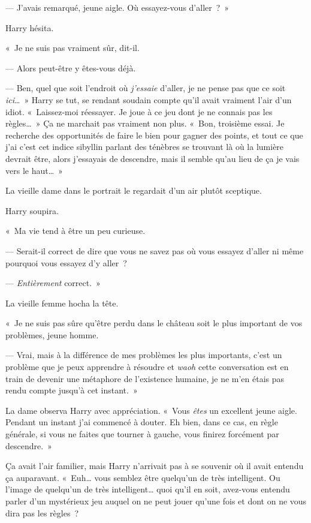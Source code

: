 --- J'avais remarqué, jeune aigle. Où essayez-vous d'aller~?~»

Harry hésita.

«~Je ne suis pas vraiment sûr, dit-il.

--- Alors peut-être y êtes-vous déjà.

--- Ben, quel que soit l'endroit où \emph{j'essaie} d'aller, je ne pense pas que ce soit \emph{ici}…~» Harry se tut, se rendant soudain compte qu'il avait vraiment l'air d'un idiot. «~Laissez-moi réessayer. Je joue à ce jeu dont je ne connais pas les règles…~» Ça ne marchait pas vraiment non plus. «~Bon, troisième essai. Je recherche des opportunités de faire le bien pour gagner des points, et tout ce que j'ai c'est cet indice sibyllin parlant des ténèbres se trouvant là où la lumière devrait être, alors j'essayais de descendre, mais il semble qu'au lieu de ça je vais vers le haut…~»

La vieille dame dans le portrait le regardait d'un air plutôt sceptique.

Harry soupira.

«~Ma vie tend à être un peu curieuse.

--- Serait-il correct de dire que vous ne savez pas où vous essayez d'aller ni même pourquoi vous essayez d'y aller~?

--- \emph{Entièrement} correct.~»

La vieille femme hocha la tête.

«~Je ne suis pas sûre qu'être perdu dans le château soit le plus important de vos problèmes, jeune homme.

--- Vrai, mais à la différence de mes problèmes les plus importants, c'est un problème que je peux apprendre à résoudre et \emph{waoh} cette conversation est en train de devenir une métaphore de l'existence humaine, je ne m'en étais pas rendu compte jusqu'à cet instant.~»

La dame observa Harry avec appréciation. «~Vous \emph{êtes} un excellent jeune aigle. Pendant un instant j'ai commencé à douter. Eh bien, dans ce cas, en règle générale, si vous ne faites que tourner à gauche, vous finirez forcément par descendre.~»

Ça avait l'air familier, mais Harry n'arrivait pas à se souvenir où il avait entendu ça auparavant. «~Euh… vous semblez être quelqu'un de très intelligent. Ou l'image de quelqu'un de très intelligent… quoi qu'il en soit, avez-vous entendu parler d'un mystérieux jeu auquel on ne peut jouer qu'une fois et dont on ne vous dira pas les règles~?

